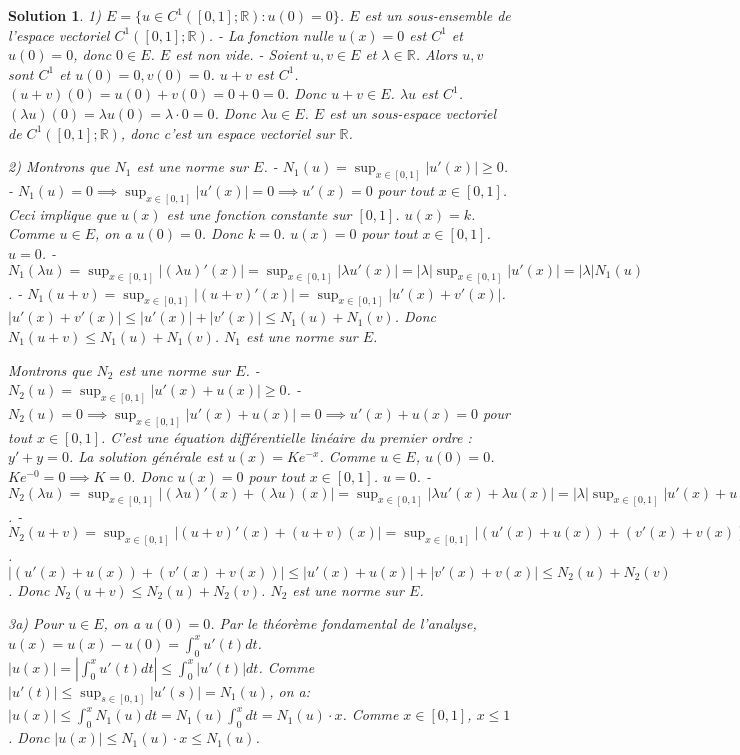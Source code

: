 \documentclass{article}
\newtheorem{solution}{Solution}
\begin{document}
\begin{solution}
1) $E = \{ u \in C^1([0, 1]; \mathbb{R}) : u(0) = 0 \}$. $E$ est un sous-ensemble de l'espace vectoriel $C^1([0, 1]; \mathbb{R})$.
- La fonction nulle $u(x)=0$ est $C^1$ et $u(0)=0$, donc $0 \in E$. $E$ est non vide.
- Soient $u, v \in E$ et $\lambda \in \mathbb{R}$. Alors $u, v$ sont $C^1$ et $u(0)=0, v(0)=0$.
$u+v$ est $C^1$. $(u+v)(0) = u(0)+v(0)=0+0=0$. Donc $u+v \in E$.
$\lambda u$ est $C^1$. $(\lambda u)(0) = \lambda u(0) = \lambda \cdot 0 = 0$. Donc $\lambda u \in E$.
$E$ est un sous-espace vectoriel de $C^1([0, 1]; \mathbb{R})$, donc c'est un espace vectoriel sur $\mathbb{R}$.

2) Montrons que $N_1$ est une norme sur $E$.
- $N_1(u) = \sup_{x \in [0,1]} |u'(x)| \ge 0$.
- $N_1(u) = 0 \implies \sup_{x \in [0,1]} |u'(x)| = 0 \implies u'(x)=0$ pour tout $x \in [0,1]$.
Ceci implique que $u(x)$ est une fonction constante sur $[0,1]$. $u(x)=k$.
Comme $u \in E$, on a $u(0)=0$. Donc $k=0$. $u(x)=0$ pour tout $x \in [0,1]$. $u=0$.
- $N_1(\lambda u) = \sup_{x \in [0,1]} |(\lambda u)'(x)| = \sup_{x \in [0,1]} |\lambda u'(x)| = |\lambda| \sup_{x \in [0,1]} |u'(x)| = |\lambda| N_1(u)$.
- $N_1(u+v) = \sup_{x \in [0,1]} |(u+v)'(x)| = \sup_{x \in [0,1]} |u'(x)+v'(x)|$.
$|u'(x)+v'(x)| \le |u'(x)|+|v'(x)| \le N_1(u) + N_1(v)$.
Donc $N_1(u+v) \le N_1(u)+N_1(v)$.
$N_1$ est une norme sur $E$.

Montrons que $N_2$ est une norme sur $E$.
- $N_2(u) = \sup_{x \in [0,1]} |u'(x)+u(x)| \ge 0$.
- $N_2(u) = 0 \implies \sup_{x \in [0,1]} |u'(x)+u(x)| = 0 \implies u'(x)+u(x)=0$ pour tout $x \in [0,1]$.
C'est une équation différentielle linéaire du premier ordre : $y'+y=0$.
La solution générale est $u(x) = K e^{-x}$.
Comme $u \in E$, $u(0)=0$. $K e^{-0} = 0 \implies K=0$.
Donc $u(x)=0$ pour tout $x \in [0,1]$. $u=0$.
- $N_2(\lambda u) = \sup_{x \in [0,1]} |(\lambda u)'(x)+(\lambda u)(x)| = \sup_{x \in [0,1]} |\lambda u'(x)+\lambda u(x)| = |\lambda| \sup_{x \in [0,1]} |u'(x)+u(x)| = |\lambda| N_2(u)$.
- $N_2(u+v) = \sup_{x \in [0,1]} |(u+v)'(x)+(u+v)(x)| = \sup_{x \in [0,1]} |(u'(x)+u(x)) + (v'(x)+v(x))|$.
$|(u'(x)+u(x)) + (v'(x)+v(x))| \le |u'(x)+u(x)| + |v'(x)+v(x)| \le N_2(u) + N_2(v)$.
Donc $N_2(u+v) \le N_2(u)+N_2(v)$.
$N_2$ est une norme sur $E$.

3a) Pour $u \in E$, on a $u(0)=0$. Par le théorème fondamental de l'analyse, $u(x) = u(x)-u(0) = \int_0^x u'(t) dt$.
$|u(x)| = |\int_0^x u'(t) dt| \le \int_0^x |u'(t)| dt$.
Comme $|u'(t)| \le \sup_{s \in [0,1]} |u'(s)| = N_1(u)$, on a:
$|u(x)| \le \int_0^x N_1(u) dt = N_1(u) \int_0^x dt = N_1(u) \cdot x$.
Comme $x \in [0,1]$, $x \le 1$. Donc $|u(x)| \le N_1(u) \cdot x \le N_1(u)$.


\end{solution}
\end{document}
